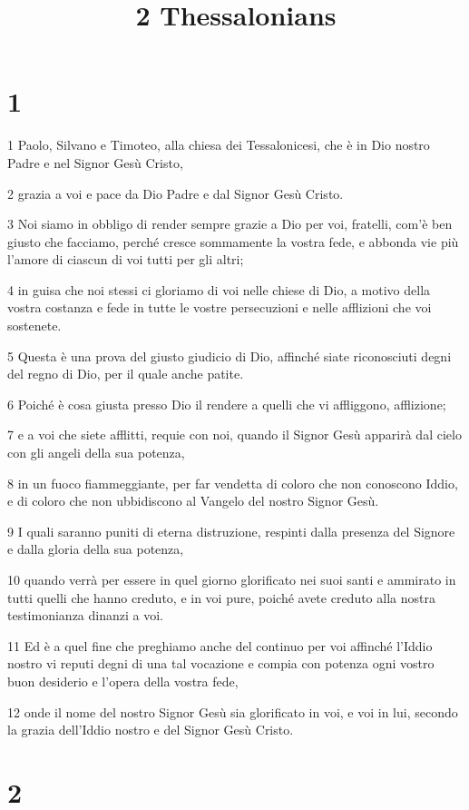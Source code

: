 

\title{2 Thessalonians}


\chapter{1}

\par 1 Paolo, Silvano e Timoteo, alla chiesa dei Tessalonicesi, che è in Dio nostro Padre e nel Signor Gesù Cristo,
\par 2 grazia a voi e pace da Dio Padre e dal Signor Gesù Cristo.
\par 3 Noi siamo in obbligo di render sempre grazie a Dio per voi, fratelli, com'è ben giusto che facciamo, perché cresce sommamente la vostra fede, e abbonda vie più l'amore di ciascun di voi tutti per gli altri;
\par 4 in guisa che noi stessi ci gloriamo di voi nelle chiese di Dio, a motivo della vostra costanza e fede in tutte le vostre persecuzioni e nelle afflizioni che voi sostenete.
\par 5 Questa è una prova del giusto giudicio di Dio, affinché siate riconosciuti degni del regno di Dio, per il quale anche patite.
\par 6 Poiché è cosa giusta presso Dio il rendere a quelli che vi affliggono, afflizione;
\par 7 e a voi che siete afflitti, requie con noi, quando il Signor Gesù apparirà dal cielo con gli angeli della sua potenza,
\par 8 in un fuoco fiammeggiante, per far vendetta di coloro che non conoscono Iddio, e di coloro che non ubbidiscono al Vangelo del nostro Signor Gesù.
\par 9 I quali saranno puniti di eterna distruzione, respinti dalla presenza del Signore e dalla gloria della sua potenza,
\par 10 quando verrà per essere in quel giorno glorificato nei suoi santi e ammirato in tutti quelli che hanno creduto, e in voi pure, poiché avete creduto alla nostra testimonianza dinanzi a voi.
\par 11 Ed è a quel fine che preghiamo anche del continuo per voi affinché l'Iddio nostro vi reputi degni di una tal vocazione e compia con potenza ogni vostro buon desiderio e l'opera della vostra fede,
\par 12 onde il nome del nostro Signor Gesù sia glorificato in voi, e voi in lui, secondo la grazia dell'Iddio nostro e del Signor Gesù Cristo.

\chapter{2}

